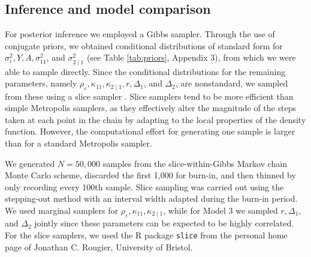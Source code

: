 \documentclass[lineno]{biometrika}
\newcommand{\svec} {s}
\newcommand{\Yvec}{Y}
\begin{document}






\subsection{Inference and model comparison}

For posterior inference we employed a Gibbs sampler. Through the use of conjugate priors, we obtained conditional distributions of standard form for $\sigma^2_\epsilon, \Yvec, A,\sigma^2_{11}$, and $\sigma^2_{2\mid 1}$ (see Table \ref{tab:priors}, Appendix 3), from which we were able to sample directly. Since the conditional distributions for the remaining parameters, namely $\rho_\varepsilon, \kappa_{11}, \kappa_{2\mid 1}, r, \Delta_1$, and $\Delta_2$, are nonstandard, we sampled from these using a slice sampler \citep{Neal_2003}. Slice samplers tend to be more efficient than simple Metropolis samplers, as they effectively alter the magnitude of the steps taken at each point in the chain by adapting to the local properties of the density function.  However, the computational effort for generating one sample is larger than for a standard Metropolis sampler.

We generated $N = 50,000$ samples from the slice-within-Gibbs Markov chain Monte Carlo scheme, discarded the first 1,000 for burn-in, and then thinned by only recording every 100th sample.  Slice sampling was carried out using the stepping-out method \citep[][Section 4]{Neal_2003} with an interval width adapted during the burn-in period. We used marginal samplers for $\rho_{\varepsilon},\kappa_{11}, \kappa_{2\mid 1}$, while for Model 3 we sampled $r,\Delta_1,$ and $\Delta_2$ jointly since these parameters can be expected to be highly correlated. For the slice samplers, we used the R \citep{R} package \texttt{slice} from the personal home page of Jonathan C. Rougier, University of Bristol. %
\end{document}
